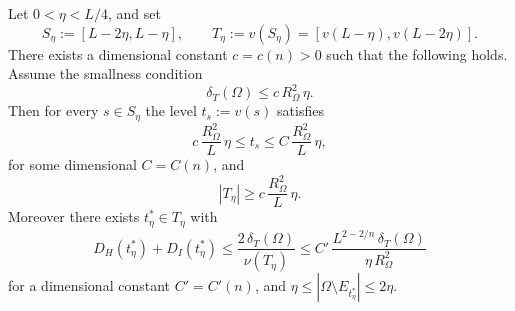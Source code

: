 \begin{lemma}\label{lem:slab-good}
Let $0<\eta<L/4$, and set
\[
   S_{\eta}:=[L-2\eta,L-\eta],
   \qquad
   T_{\eta}:=v(S_{\eta})=[v(L-\eta),v(L-2\eta)].
\]
There exists a dimensional constant $c=c(n)>0$ such that the following
holds. Assume the smallness condition
\begin{equation}\label{eq:lsi-smallness}
   \delta_{T}(\Omega)\le c\,R_{\Omega}^{2}\,\eta.
\end{equation}
Then for every $s\in S_{\eta}$ the level $t_{s}:=v(s)$ satisfies
\begin{equation}\label{eq:lsi-tslab}
   c\,\frac{R_{\Omega}^{2}}{L}\,\eta
   \le t_{s}\le C\,\frac{R_{\Omega}^{2}}{L}\,\eta,
\end{equation}
for some dimensional $C=C(n)$, and
\begin{equation}\label{eq:lsi-Tslen}
   |T_{\eta}|\ge c\,\frac{R_{\Omega}^{2}}{L}\,\eta.
\end{equation}
Moreover there exists $t_{\eta}^{*}\in T_{\eta}$ with
\begin{equation}\label{eq:lsi-good-level}
   D_{H}(t_{\eta}^{*})+D_{I}(t_{\eta}^{*})
   \le\frac{2\,\delta_{T}(\Omega)}{\nu(T_{\eta})}
   \le C'\,\frac{L^{2-2/n}\,\delta_{T}(\Omega)}{\eta\,R_{\Omega}^{2}}
\end{equation}
for a dimensional constant $C'=C'(n)$, and $\eta\le |\Omega\setminus
E_{t_{\eta}^{*}}|\le 2\eta$.
\end{lemma}

